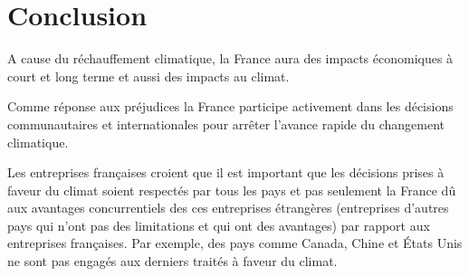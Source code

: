 \documentclass[a4paper,10pt]{article}
\begin{document}
\section*{Conclusion}


A cause du réchauffement climatique,  la France aura des impacts économiques à
court et long terme et aussi des impacts au climat.

Comme réponse aux préjudices la France participe activement dans les décisions
communautaires  et internationales  pour  arrêter l'avance  rapide du  changement
climatique.

Les entreprises françaises  croient que  il est  important que  les décisions
prises à faveur du climat soient respectés par tous les pays et pas seulement la
France  dû   aux  avantages   concurrentiels  des  ces   entreprises  étrangères
(entreprises  d'autres  pays  qui n'ont  pas  des  limitations  et qui  ont  des
avantages) par rapport  aux entreprises françaises. Par exemple,  des pays comme
Canada, Chine et États Unis ne sont pas engagés aux derniers traités à faveur du
climat.



\nocite{GREENPEACE}
\nocite{FR}
\nocite{ACTU}
\nocite{GV}
\nocite{DIC}
\nocite{SEQ}
\nocite{DOC}

\begin{small}
  
\end{small}
\section*{}
\end{document}
